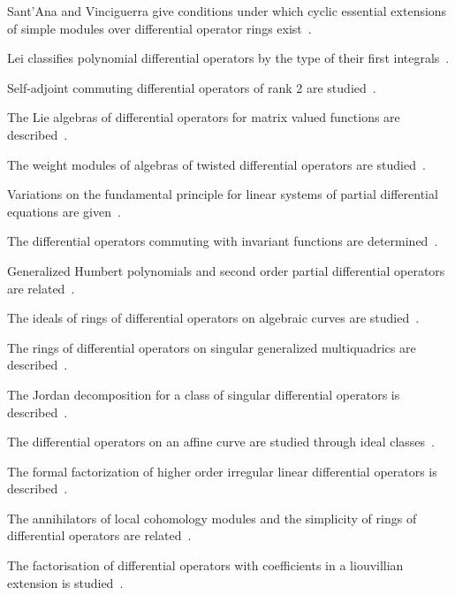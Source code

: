 Sant'Ana and Vinciguerra give conditions under which cyclic essential extensions of simple modules over differential operator rings exist~\cite{WlOnCyclicEssentialExtensionsOfS2020}.

Lei classifies polynomial differential operators by the type of their first integrals~\cite{WlOnAClassificationOfPolynomialD2020}.

Self-adjoint commuting differential operators of rank 2 are studied~\cite{WlSelfAdjointCommutingDifferenti2020}.

The Lie algebras of differential operators for matrix valued functions are described~\cite{WlLieAlgebrasOfDifferentialOpera2020}.

The weight modules of algebras of twisted differential operators are studied~\cite{WlOnWeightModulesOfAlgebrasOfTwi2020}.

Variations on the fundamental principle for linear systems of partial differential equations are given~\cite{WlVariationsOnTheFundamentalPrin2020}.

The differential operators commuting with invariant functions are determined~\cite{WlDifferentialOperatorsCommuting2020}.

Generalized Humbert polynomials and second order partial differential operators are related~\cite{WlGeneralizedHumbertPolynomialsA2020}.

The ideals of rings of differential operators on algebraic curves are studied~\cite{WlIdealsOfRingsOfDifferentialOpe2020}.

The rings of differential operators on singular generalized multiquadrics are described~\cite{WlRingsOfDifferentialOperatorsOn2020}.

The Jordan decomposition for a class of singular differential operators is described~\cite{WlJordanDecompositionForAClassOf2020}.

The differential operators on an affine curve are studied through ideal classes~\cite{WlDifferentialOperatorsOnAnAffin2020}.

The formal factorization of higher order irregular linear differential operators is described~\cite{WlFormalFactorizationOfHigherOrd2020}.

The annihilators of local cohomology modules and the simplicity of rings of differential operators are related~\cite{WlAnnihilatorsOfLocalCohomologyM2020}.

The factorisation of differential operators with coefficients in a liouvillian extension is studied~\cite{WlFactorisationDOpRateursDiffRen2020}.
